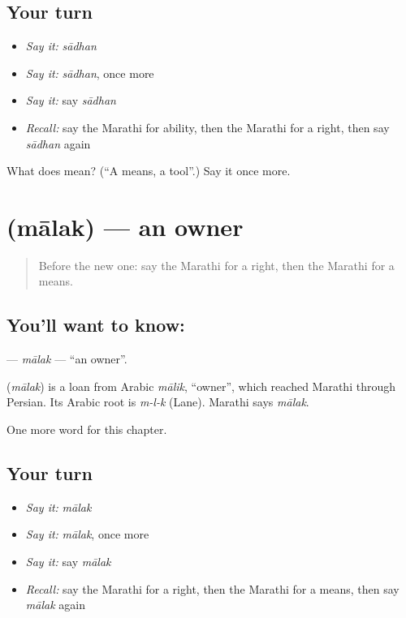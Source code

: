 \subsection*{Your turn}
\begin{itemize}
\raggedright
  \item \emph{Say it:} \emph{sādhan}
  \item \emph{Say it:} \emph{sādhan}, once more
  \item \emph{Say it:} say \emph{sādhan}
  \item \emph{Recall:} say the Marathi for ability, then the Marathi for a right, then say \emph{sādhan} again
\end{itemize}

\begin{tcolorbox}[breakable,colback=teal!4,colframe=teal!35!black,title={Before you move on}]
What does  mean? (\textquotedblleft{}A means, a tool\textquotedblright{}.) Say it once more.
\end{tcolorbox}
\section[\texorpdfstring{\mr{मालक} (mālak)}{मालक (mālak)}]{ (mālak) — an owner}

\label{lesson:MR-C122-malak}



\begin{quote}
Before the new one: say the Marathi for a right, then the Marathi for a means.
\end{quote}

\subsection*{You'll want to know: }
\textbf{} — \emph{mālak} — \textquotedblleft{}an owner\textquotedblright{}.

\begin{cousinweb}
\textbf{} (\emph{mālak}) is a loan from Arabic \emph{mālik}, \textquotedblleft{}owner\textquotedblright{}, which reached Marathi through Persian. Its Arabic root is \emph{m-l-k} (Lane). Marathi says \emph{mālak}.
\end{cousinweb}

\begin{grammarlens}[title={What you've built}]
One more word for this chapter.
\end{grammarlens}

\subsection*{Your turn}
\begin{itemize}
\raggedright
  \item \emph{Say it:} \emph{mālak}
  \item \emph{Say it:} \emph{mālak}, once more
  \item \emph{Say it:} say \emph{mālak}
  \item \emph{Recall:} say the Marathi for a right, then the Marathi for a means, then say \emph{mālak} again
\end{itemize}

